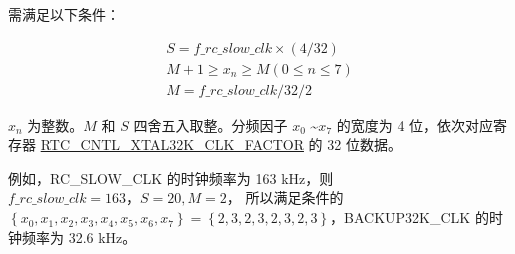 \documentclass[main\_\_CN.tex]{subfiles}
\begin{document}
需满足以下条件：

    \begin{gather*}
    S = f\_rc\_slow\_clk \times (4/32)\\
    M + 1 \geq x_n \geq M (0 \leq n \leq 7)\\
    M = f\_rc\_slow\_clk/32/2
    \end{gather*}
    
\begin{math}x_n\end{math} 为整数。\begin{math}M\end{math} 和 \begin{math}S\end{math} 四舍五入取整。分频因子 \begin{math}x_0\end{math} \textasciitilde \begin{math}x_7\end{math} 的宽度为 4 位，依次对应寄存器 \hyperref[fielddesc:RTCCNTLXTAL32KCLKFACTOR]{RTC\_CNTL\_XTAL32K\_CLK\_FACTOR} 的 32 位数据。

例如，RC\_SLOW\_CLK 的时钟频率为 163 kHz，则 \begin{math} f\_rc\_slow\_clk = 163，S = 20, M = 2 \end{math}， 所以满足条件的 \begin{math}
\left\{x_0, x_1, x_2, x_3, x_4, x_5, x_6, x_7\right\} = \left\{2, 3, 2, 3, 2, 3, 2, 3\right\}\end{math}，BACKUP32K\_CLK 的时钟频率为 32.6 kHz。
\end{document}
